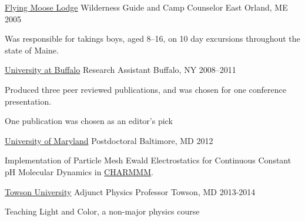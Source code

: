 


\begin{cventries}
  \cventry
    {\href{www.flyingmooselodge.com}{Flying Moose Lodge}}
    {Wilderness Guide and Camp Counselor}
    {East Orland, ME} {2005}
    {
    \begin{cvitems}
        \item Was responsible for takings boys, aged 8--16, on 10 day excursions throughout the state of Maine.
    \end{cvitems}
    }

  \cventry
    {\href{www.buffalo.edu}{University at Buffalo}}
    {Research Assistant}
    {Buffalo, NY} {2008--2011}
    {
    \begin{cvitems}
	  \item {Produced three peer reviewed publications, and was chosen for one conference presentation.}
      \item {One publication was chosen as an editor's pick}
    \end{cvitems}
    }

\cventry
    {\href{www.umaryland.edu}{University of Maryland}}
    {Postdoctoral}
    {Baltimore, MD} {2012}
    {
    \begin{cvitems}
        \item Implementation of Particle Mesh Ewald Electrostatics for Continuous Constant pH Molecular Dynamics in \href{www.charmm.org}{CHARMMM}.
    \end{cvitems}
    }

\cventry
    {\href{www.towson.edu}{Towson University}}
    {Adjunct Physics Professor}
    {Towson, MD} {2013-2014}
    {
    \begin{cvitems}
        \item Teaching Light and Color, a non-major physics course
    \end{cvitems}
    }



\end{cventries}
